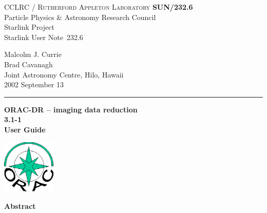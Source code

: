 \documentclass[twoside,11pt]{article}
\newcommand{\stardoccategory}  {Starlink User Note}
\newcommand{\stardocinitials}  {SUN}
\newcommand{\stardocnumber}    {232.6}
\newcommand{\stardocauthors}   {Malcolm J. Currie\\
                               Brad Cavanagh\\
                               Joint Astronomy Centre, Hilo, Hawaii}
\newcommand{\stardocdate}      {2002 September 13}
\newcommand{\stardoctitle}     {ORAC-DR -- imaging data reduction}
\newcommand{\stardocversion}   {3.1-1}
\newcommand{\stardocmanual}    {User Guide}
\newcommand{\stardocname}{\stardocinitials /\stardocnumber}
\newenvironment{latexonly}{}{}
\renewcommand{\_}{\texttt{\symbol{95}}}
\begin{document}
\thispagestyle{empty}

\begin{latexonly}
   CCLRC / \textsc{Rutherford Appleton Laboratory} \hfill \textbf{\stardocname}\\
   {\large Particle Physics \& Astronomy Research Council}\\
   {\large Starlink Project\\}
   {\large \stardoccategory\ \stardocnumber}
   \begin{flushright}
   \stardocauthors\\
   \stardocdate
   \end{flushright}
   \vspace{-4mm}
   \rule{\textwidth}{0.5mm}
   \vspace{5mm}
   \begin{center}
   {\Huge\textbf{\stardoctitle \\ [2.5ex]}}
   {\LARGE\textbf{\stardocversion \\ [4ex]}}
   {\Huge\textbf{\stardocmanual}}
   \end{center}
   \vspace{5mm}

\begin{center}
\includegraphics[width=1.0in]{sun232_logo.eps}
\end{center}

   \vspace{10mm}
   \begin{center}
      {\Large\textbf{Abstract}}
   \end{center}
\end{latexonly}
\end{document}
